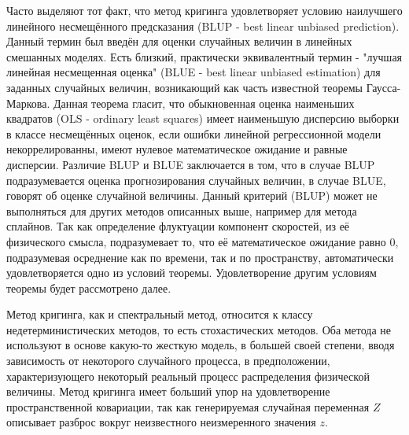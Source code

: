 Часто выделяют тот факт, что метод кригинга удовлетворяет условию наилучшего линейного несмещённого предсказания (BLUP - best linear unbiased prediction). Данный термин был введён для оценки случайных величин в линейных смешанных моделях. Есть близкий, практически эквивалентный термин - "лучшая линейная несмещенная оценка" (BLUE - best linear unbiased estimation) для заданных случайных величин, возникающий как часть известной теоремы Гаусса-Маркова\cite[с.~64]{Rasmussen}. Данная теорема гласит, что обыкновенная оценка наименьших квадратов (OLS - ordinary least squares) имеет наименьшую дисперсию выборки в классе несмещённых оценок, если ошибки линейной регрессионной модели некоррелированны, имеют нулевое математическое ожидание и равные дисперсии. Различие BLUP и BLUE заключается в том, что в случае BLUP подразумевается оценка прогнозирования случайных величин, в случае BLUE, говорят об оценке случайной величины. Данный критерий (BLUP) может не выполняться для других методов описанных выше, например для метода сплайнов. Так как определение флуктуации компонент скоростей, из её физического смысла, подразумевает то, что её математическое ожидание равно 0, подразумевая осреднение как по времени, так и по пространству, автоматически удовлетворяется одно из условий теоремы. Удовлетворение другим условиям теоремы будет рассмотрено далее. 

Метод кригинга, как и спектральный метод, относится к классу недетерминистических методов, то есть стохастических методов. Оба метода не используют в основе какую-то жесткую модель, в большей своей степени, вводя зависимость от некоторого случайного процесса, в предположении, характеризующего некоторый реальный процесс распределения физической величины. Метод кригинга имеет больший упор на удовлетворение пространственной ковариации, так как генерируемая случайная переменная $Z$ описывает разброс вокруг неизвестного неизмеренного значения $z$. 

